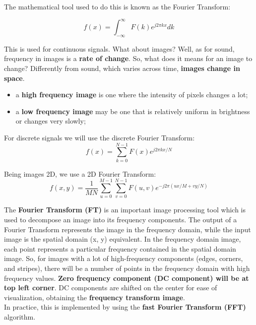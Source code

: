 \documentclass{article}
\begin{document}
The mathematical tool used to do this is known as the Fourier Transform:

\begin{equation*}
    f(x) = \int_{-\infty}^{\infty}F(k) e^{j2\pi kx}dk
\end{equation*}

This is used for continuous signals. What about images? Well, as for sound, frequency in images is a \textbf{rate of change}. So, what does it means for an image to change? Differently from sound, which varies across time, \textbf{images change in space}.

\begin{itemize}
    \item a \textbf{high frequency image} is one where the intensity of pixels changes a lot;
    \item a \textbf{low frequency image} may be one that is relatively uniform in brightness or changes very slowly;
\end{itemize}

For discrete signals we will use the discrete Fourier Transform:
\begin{equation*}
    f(x) = \sum_{k=0}^{N-1} F(x) e^{j2\pi kx / N}
\end{equation*}

Being images 2D, we use a 2D Fourier Transform:
\begin{equation*}
    f(x,y) = \frac{1}{MN}\sum_{u=0}^{M-1} \sum_{v=0}^{N-1} F(u, v) e^{-j2\pi(ux/M + vy/N)}
\end{equation*}

The \textbf{Fourier Transform (FT)} is an important image processing tool which is used to decompose an image into its frequency components. The output of a Fourier Transform represents the image in the frequency domain, while the input image is the spatial domain (x, y) equivalent. In the frequency domain image, each point represents a particular frequency contained in the spatial domain image. So, for images with a lot of high-frequency components (edges, corners, and stripes), there will be a number of points in the frequency domain with high frequency values. \textbf{Zero frequency component (DC component) will be at top left corner}. DC components are shifted on the center for ease of visualization, obtaining the \textbf{frequency transform image}.\\ 

In practice, this is implemented by using the \textbf{fast Fourier Transform (FFT)} algorithm.
\end{document}
